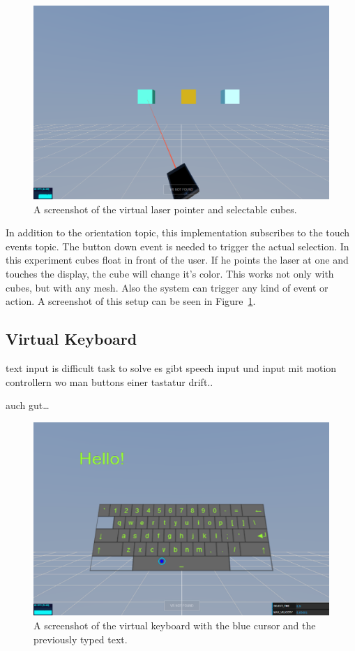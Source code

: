 \begin{figure}[htpb]
  \centering
  \includegraphics[width=12cm]{figures/screenshot_exp_lp.png}
  \caption[Screenshot: laser pointer experiment]{A screenshot of the virtual laser pointer and selectable cubes.}\label{fig:screenshot-exp-lp}
\end{figure}

In addition to the orientation topic, this implementation subscribes to the touch events topic. The button down event is needed to trigger the actual selection.
In this experiment cubes float in front of the user. If he points the laser at one and touches the display, the cube will change it's color. This works not only with cubes, but with any mesh. Also the system can trigger any kind of event or action. A screenshot of this setup can be seen in Figure~\ref{fig:screenshot-exp-lp}.


\subsection{Virtual Keyboard}\label{subsection:virtual-keyboard}

text input is difficult task to solve
es gibt speech input und input mit motion controllern wo man buttons einer tastatur drift..

auch gut\dots




\begin{figure}[htpb]
  \centering
  \includegraphics[width=12cm]{figures/screenshot_exp_vk.png}
  \caption[Screenshot: virtual keyboard experiment]{A screenshot of the virtual keyboard with the blue cursor and the previously typed text.}\label{fig:screenshot-exp-vk}
\end{figure}
